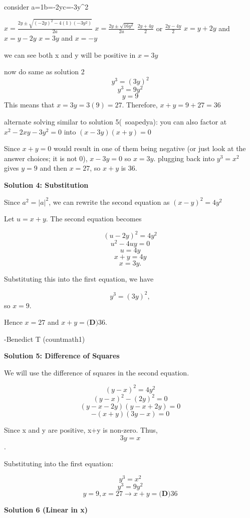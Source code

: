 \begin{enumerate}
 consider a=1b=-2yc=-3y\textasciicircum{}2

 $x=\frac{2y\pm\sqrt{(-2y)^2-4(1)(-3y^2)}}{2a}$
$x=\frac{2y\pm\sqrt{16y^2}}{2a}$
$\frac{2y+4y}{2}$ or $\frac{2y-4y}{2}$
$x=y+2y$ and $x=y-2y$
$x=3y$ and $x=-y$

 we can see both x and y will be positive in $x=3y$

 now do same as solution 2
 \[y^3 = (3y)^2\]
 \[y^3 = 9y^2\]
 \[y=9\]This means that $x=3y=3(9)=27$. Therefore, $x+y=9+27=\boxed{36}$

 alternate solving similar to solution 5(~soapedya): you can also factor at $x^2-2xy-3y^2 = 0$ into $(x-3y)(x+y) = 0$ 

 Since $x+y = 0$ would result in one of them being negative (or just look at the answer choices; it is not 0), $x-3y = 0$ so $x = 3y$. plugging back into $y^3 = x^2$ gives $y = 9$ and then $x=27$, so $x+y$ is $\boxed{36}$.

 



\textbf{Solution 4: Substitution}

Since $a^2 = |a|^2$, we can rewrite the second equation as $(x-y)^2=4y^2$

 Let $u=x+y$. The second equation becomes

 

 \[(u-2y)^2 = 4y^2\]
 \[u^2 - 4uy = 0\]
 \[u = 4y\]
 \[x+y = 4y\]
 \[x = 3y.\]

 Substituting this into the first equation, we have 

 
 \[y^3 = (3y)^2,\]so $x = 9$. 

 Hence $x = 27$ and $x + y = \boxed{\textbf{(D)} 36}.$

 -Benedict T (countmath1)

 



\textbf{Solution 5: Difference of Squares}

We will use the difference of squares in the second equation.

 
 \[(y-x)^2=4y^2\]
 \[(y-x)^2-(2y)^2=0\]
 \[(y-x-2y)(y-x+2y)=0\]
 \[-(x+y)(3y-x)=0\]

 Since x and y are positive, x+y is non-zero. Thus, 
 \[3y=x\].

 Substituting into the first equation:

 
 \[y^3=x^2\]
 \[y^3=9y^2\]
 \[y=9, x=27 \rightarrow x+y=\boxed{\textbf{(D)} 36}\]




\textbf{Solution 6 (Linear in x)}


\end{enumerate}
